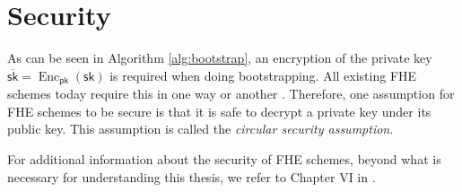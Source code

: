 \section{Security}

As can be seen in Algorithm \ref{alg:bootstrap}, an encryption of the private key $\overline{\mathsf{sk}} = \operatorname{Enc}_{\mathsf{pk}}(\mathsf{sk})$ is required when doing bootstrapping. All existing FHE schemes today require this in one way or another \cite{cite:QianFHE}. Therefore, one assumption for FHE schemes to be secure is that it is safe to decrypt a private key under its public key. This assumption is called the \textit{circular security assumption}.

For additional information about the security of FHE schemes, beyond what is necessary for understanding this thesis, we refer to Chapter VI in \cite{cite:QianFHE}.

